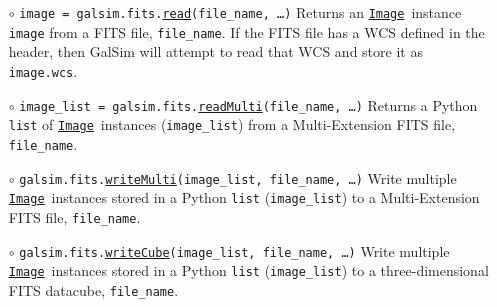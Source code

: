 \documentclass[preprint,10pt]{../../devel/modules/aastex}
\newcommand\Image{\href{http://galsim-developers.github.io/GalSim/classgalsim_1_1image_1_1_image.html}{\texttt{Image}}}
\begin{document}
\begin{itemize}

  \item[$\circ$] 
  \texttt{image = galsim.fits.\href{http://galsim-developers.github.io/GalSim/namespacegalsim_1_1fits.html\#abbad6f82a80bc74fb22a752af1bbd8e9}{read}(file\_name, \dots)} 
    \newline
    Returns an \Image\ instance \texttt{image} from a FITS file, \texttt{file\_name}.
    If the FITS file has a WCS defined in the header,
    then GalSim will attempt to read that WCS and store it as \texttt{image.wcs}.
  \item[$\circ$] 
  \texttt{image\_list = galsim.fits.\href{http://galsim-developers.github.io/GalSim/namespacegalsim_1_1fits.html\#ae7aacb9f44faf9e487e83e12b9dd9067}{readMulti}(file\_name, \dots)}
    \newline
    Returns a Python \texttt{list} of \Image\ instances (\texttt{image\_list}) from a
    Multi-Extension FITS file, \texttt{file\_name}.
  \item[$\circ$] 
  \texttt{galsim.fits.\href{http://galsim-developers.github.io/GalSim/namespacegalsim_1_1fits.html\#a17dbb70385408586795efade476cdc98}{writeMulti}(image\_list, file\_name, \dots)}
    \newline 
    Write multiple \Image\ instances stored in a Python
    \texttt{list} (\texttt{image\_list}) to a Multi-Extension FITS file, \texttt{file\_name}.
  \item[$\circ$] 
  \texttt{galsim.fits.\href{http://galsim-developers.github.io/GalSim/namespacegalsim_1_1fits.html\#aa4fbd5ed42ffecda339a409296f0f101}{writeCube}(image\_list, file\_name, \dots)}
    \newline 
    Write multiple \Image\ instances stored in a Python
    \texttt{list} (\texttt{image\_list}) to a three-dimensional FITS datacube, \texttt{file\_name}.

\end{itemize}
\end{document}
